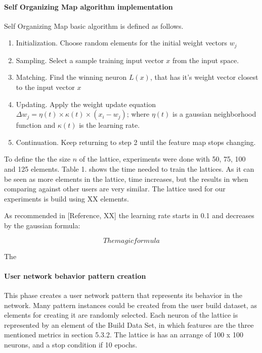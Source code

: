 \documentclass{article}
\begin{document}
\paragraph{Self Organizing Map algorithm implementation} %
Self Organizing Map basic algorithm is defined as follows.
\begin{enumerate}
\item Initialization. Choose random elements for the initial weight vectors $w_j$
\item Sampling. Select a sample training input vector $x$ from the input space.
\item Matching. Find the winning neuron $L(x)$, that has it's weight vector closest to the input vector $x$
\item Updating. Apply the weight update equation $\Delta w_j=\eta(t) \times \kappa(t) \times (x_i - w_j)$; where $\eta(t)$ is a gaussian neighborhood function and $\kappa(t)$ is the learning rate.
\item Continuation. Keep returning to step 2 until the feature map stops changing.
\end{enumerate}

To define the the size $n$ of the lattice, experiments were done with 50, 75, 100 and 125 elements. Table 1. shows the time needed to train the lattices. As it can be seen as more elements in the lattice, time increases, but the results in when comparing against other users are very similar. The lattice used for our experiments is build using XX elements.

As recommended in [Reference, XX] the learning rate starts in 0.1 and decreases by the gaussian formula:

\begin{equation}
The magic formula
\end{equation}

The 






\paragraph{User network behavior pattern creation} %
This phase creates a user network pattern that represents its behavior in the network. Many pattern instances could be created from the user build dataset, as elements for creating it are randomly selected. Each neuron of the lattice is represented by an element of the Build Data Set, in which features are the three mentioned metrics in section 5.3.2. The lattice is has an arrange of 100 x 100 neurons, and a stop condition if 10 epochs.
\end{document}
